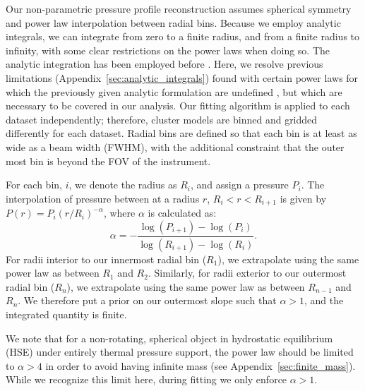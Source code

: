 \documentclass[twocolumn,traditabstract]{aa}
\begin{document}
Our non-parametric pressure profile reconstruction assumes spherical symmetry and power law interpolation between radial bins.
Because we employ analytic integrals, we can integrate from zero to a finite radius, and from a finite radius to infinity,
with some clear restrictions on the power
laws when doing so. The analytic integration has been employed before \citep[e.g.][]{vikhlinin2001a,korngut2011,sarazin2016}.
Here, we resolve  previous limitations (Appendix~\ref{sec:analytic_integrals}) found with certain power laws for which the
previously given analytic formulation are undefined \citep{korngut2011,sarazin2016}, but which are necessary to be covered
in our analysis.
Our fitting algorithm is applied
to each dataset independently; therefore, cluster models are binned and gridded differently for each dataset.
Radial bins are defined so that
each bin is at least as wide as a beam width (FWHM), with the additional constraint that the outer most bin
is beyond the FOV of the instrument.

For each bin, $i$, we denote the radius as $R_i$, and assign a pressure $P_i$. The interpolation of pressure
between at a radius $r$, $R_i < r < R_{i+1}$ is given by $P(r) = P_i (r/R_{i})^{-\alpha}$, where $\alpha$ is
calculated as:
\begin{equation}
  \alpha = -\frac{\log(P_{i+1}) - \log(P_i)}{\log(R_{i+1}) - \log(R_i)}.
\end{equation}
For radii interior to our innermost radial bin ($R_1$), we extrapolate using the same power law as between $R_1$ and
$R_2$. Similarly, for radii exterior to our outermost radial bin ($R_n$), we extrapolate using the same power law as
between $R_{n-1}$ and $R_n$. We therefore put a prior on our outermost slope such that $\alpha > 1$, and the integrated
quantity is finite.

We note that for a non-rotating, spherical object in hydrostatic equilibrium (HSE) under entirely thermal pressure
support, the power law should be
limited to $\alpha >4$ in order to avoid having infinite mass (see Appendix~\ref{sec:finite_mass}). While we recognize
this limit here, during fitting we only enforce $\alpha > 1$.
\end{document}
